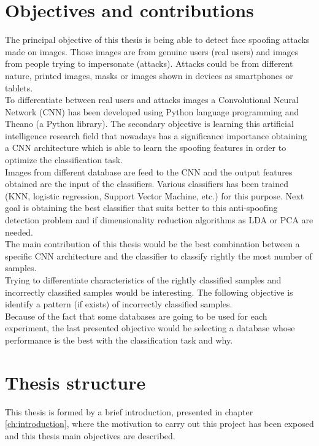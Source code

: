 \section{Objectives and contributions}
The principal objective of this thesis is being able to detect face spoofing attacks made on images. Those images are from genuine users (real users) and images from people trying to impersonate (attacks). Attacks could be from different nature, printed images, masks or images shown in devices as smartphones or tablets.\\

To differentiate between real users and attacks images a Convolutional Neural Network (CNN) has been developed using Python language programming and Theano (a Python library). The secondary objective is learning this artificial intelligence research field that nowadays has a significance importance obtaining a CNN architecture which is able to learn the spoofing features in order to optimize the classification task.\\

Images from different database are feed to the CNN and the output features obtained are the input of the classifiers. Various classifiers has been trained (KNN, logistic regression, Support Vector Machine, etc.) for this purpose. Next goal is obtaining the best classifier that suits better to this anti-spoofing detection problem and if dimensionality reduction algorithms as LDA or PCA are needed.\\

The main contribution of this thesis would be the best combination between a specific CNN architecture and the classifier to classify rightly the most number of samples.\\

Trying to differentiate characteristics of the rightly classified samples and incorrectly classified samples would be interesting. The following objective is identify a pattern (if exists) of incorrectly classified samples.\\

Because of the fact that some databases are going to be used for each experiment, the last presented objective would be  selecting a database whose performance is the best with the classification task and why.\\

\section{Thesis structure}
This thesis is formed by a brief introduction, presented in chapter \ref{ch:introduction}, where the motivation to carry out this project has been exposed and this thesis main objectives are described.\\

